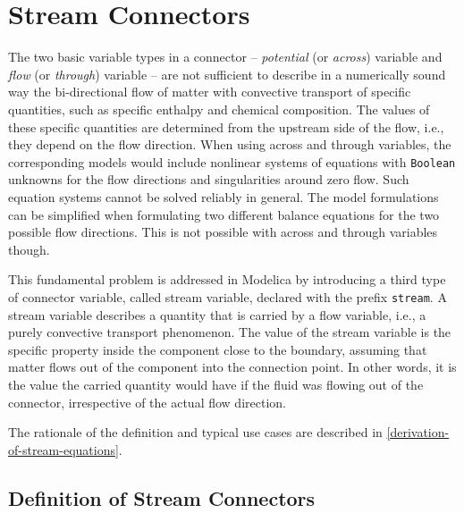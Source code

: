 \chapter{Stream Connectors}\label{stream-connectors}

The two basic variable types in a connector -- \emph{potential} (or \emph{across}) variable and \emph{flow} (or \emph{through}) variable -- are not sufficient to describe in a numerically sound way the bi-directional flow of matter with convective transport of specific quantities, such as specific enthalpy and chemical composition.  The values of these specific quantities are determined from the upstream side of the flow, i.e., they depend on the flow direction.  When using across and through variables, the corresponding models would include nonlinear systems of equations with \lstinline!Boolean! unknowns for the flow directions and singularities around zero flow.  Such equation systems cannot be solved reliably in general.  The model formulations can be simplified when formulating two different balance equations for the two possible flow directions.  This is not possible with across and through variables though.

This fundamental problem is addressed in Modelica by introducing a third
type of connector variable, called stream variable, declared with the
prefix \lstinline!stream!. A stream variable describes a quantity that is
carried by a flow variable, i.e., a purely convective transport
phenomenon. The value of the stream variable is the specific property
inside the component close to the boundary, assuming that matter flows
out of the component into the connection point. In other words, it is
the value the carried quantity would have if the fluid was flowing out
of the connector, irrespective of the actual flow direction.

The rationale of the definition and typical use cases are described in
\cref{derivation-of-stream-equations}.

\section{Definition of Stream Connectors}\label{definition-of-stream-connectors}


